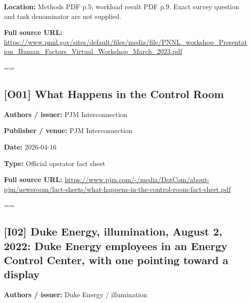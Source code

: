 \documentclass[10pt,letterpaper]{article}
\begin{document}
\textbf{Location:} Methods PDF p.5; workload result PDF p.9. Exact survey question and task denominator are not supplied.\par
\textbf{Full source URL:} \href{https://www.pnnl.gov/sites/default/files/media/file/PNNL_workshop_Presentation_Human_Factors_Virtual_Workshop_March_2023.pdf}{\small\ttfamily https:/\allowbreak{}/\allowbreak{}www.\allowbreak{}pnnl.\allowbreak{}gov/\allowbreak{}sites/\allowbreak{}default/\allowbreak{}files/\allowbreak{}media/\allowbreak{}file/\allowbreak{}PNNL\_\allowbreak{}workshop\_\allowbreak{}Presentation\_\allowbreak{}Human\_\allowbreak{}Factors\_\allowbreak{}Virtual\_\allowbreak{}Workshop\_\allowbreak{}March\_\allowbreak{}2023.\allowbreak{}pdf}\par
\egroup\par\noindent\box\readingEntry\par\medskip
\setbox\readingEntry=\vbox\bgroup\hsize=\linewidth\subsection*{[O01] What Happens in the Control Room}
\textbf{Authors / issuer:} PJM Interconnection\par
\textbf{Publisher / venue:} PJM Interconnection\par
\textbf{Date:} 2026-04-16\par
\textbf{Type:} Official operator fact sheet\par
\textbf{Full source URL:} \href{https://www.pjm.com/-/media/DotCom/about-pjm/newsroom/fact-sheets/what-happens-in-the-control-room-fact-sheet.pdf}{\small\ttfamily https:/\allowbreak{}/\allowbreak{}www.\allowbreak{}pjm.\allowbreak{}com/\allowbreak{}-\allowbreak{}/\allowbreak{}media/\allowbreak{}DotCom/\allowbreak{}about-\allowbreak{}pjm/\allowbreak{}newsroom/\allowbreak{}fact-\allowbreak{}sheets/\allowbreak{}what-\allowbreak{}happens-\allowbreak{}in-\allowbreak{}the-\allowbreak{}control-\allowbreak{}room-\allowbreak{}fact-\allowbreak{}sheet.\allowbreak{}pdf}\par
\egroup\par\noindent\box\readingEntry\par\medskip
\setbox\readingEntry=\vbox\bgroup\hsize=\linewidth\subsection*{[I02] Duke Energy, illumination, August 2, 2022: Duke Energy employees in an Energy Control Center, with one pointing toward a display}
\textbf{Authors / issuer:} Duke Energy / illumination\par
\end{document}
